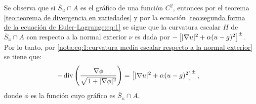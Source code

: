 \documentclass[a4paper,11pt,spanish, twoside, leqno]{tfm-uam}
\begin{document}
Se observa que si $\overline{S}_{u}\cap A$ es el gráfico de una función $C^{2}$, entonces por el teorema \ref{teo:teorema de divergencia en variedades} y por la ecuación \ref{teo:segunda forma de la ecuación de Euler-Lagrange:eq:1} se sigue que la curvatura escalar  $H$ de $\overline{S}_{u}\cap A$ con respecto a la normal exterior $\nu$ es dada por $-\left [\lvert\nabla{u}\rvert^{2}+\alpha (u-g)^{2}\right ]^{\pm}$. Por lo tanto, por \ref{nota:eq:1:curvatura media escalar respecto a la normal exterior} se tiene que:
\begin{align}\label{eq:1:ecuacion de curvatura media}
-\operatorname{div}\left( \dfrac{\nabla{\phi}}{\sqrt{1+\lvert\nabla{\phi}\rvert^{2}}}\right ) = \left [ \lvert\nabla{u}\rvert^{2}+\alpha (u-g)^{2}\right ]^{\pm},
\end{align}
donde $\phi$ es la función cuyo gráfico es $\overline{S}_{u}\cap A$. 
\end{document}
